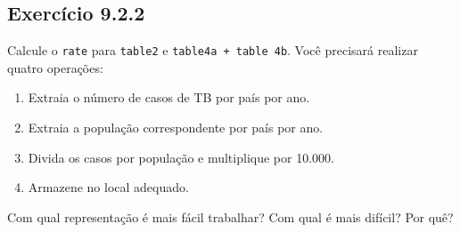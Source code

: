 \documentclass[
]{latex/krantz}
\providecommand{\tightlist}{%
  \setlength{\itemsep}{0pt}\setlength{\parskip}{0pt}}
\theoremstyle{definition}
\theoremstyle{definition}
\theoremstyle{definition}
\theoremstyle{definition}
\theoremstyle{remark}
\begin{document}
\hypertarget{exr9-2-2}{%
\subsection*{Exercício 9.2.2}\label{exr9-2-2}}

Calcule o \texttt{rate} para \texttt{table2} e \texttt{table4a\ +\ table\ 4b}. Você precisará realizar quatro operações:

\begin{enumerate}
\def\labelenumi{\alph{enumi}.}
\tightlist
\item
  Extraia o número de casos de TB por país por ano.
\item
  Extraia a população correspondente por país por ano.
\item
  Divida os casos por população e multiplique por 10.000.
\item
  Armazene no local adequado.
\end{enumerate}

Com qual representação é mais fácil trabalhar? Com qual é mais difícil? Por quê?
\end{document}
